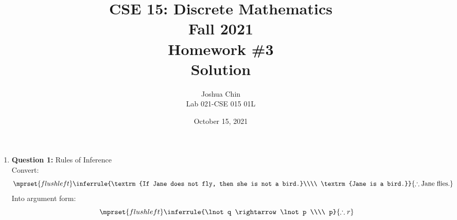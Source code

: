 \documentclass[11pt]{article}
\begin{document}
\author{Joshua Chin\\
Lab 021-CSE 015 01L}

\title{CSE 15: Discrete Mathematics\\
Fall 2021\\
Homework \#3\\
Solution}

\date{October 15, 2021}
\maketitle

\begin{enumerate}

\item
\textbf{Question 1:} Rules of Inference \\
Convert: 
\begin{equation*}
\mprset{flushleft}
\inferrule
    {\textrm{If Jane does not fly, then she is not a bird.}\\\\ \textrm{Jane is a bird.}}
    {\therefore \textrm{Jane flies.}}
\end{equation*}
Into argument form: 
\begin{equation*}
\mprset{flushleft}
\inferrule
    {\lnot q \rightarrow \lnot p \\\\ p}
    {\therefore r}
\end{equation*}


\end{enumerate}
\end{document}
